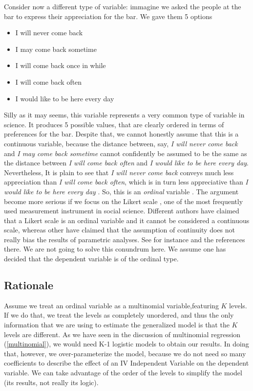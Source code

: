 \documentclass[
]{book}
\providecommand{\tightlist}{%
  \setlength{\itemsep}{0pt}\setlength{\parskip}{0pt}}
\begin{document}
Consider now a different type of variable: immagine we asked the people at the bar to express their appreciation for the bar. We gave them 5 options

\begin{itemize}
\tightlist
\item
  I will never come back
\item
  I may come back sometime
\item
  I will come back once in while
\item
  I will come back often
\item
  I would like to be here every day
\end{itemize}

Silly as it may seems, this variable represents a very common type of variable in science. It produces 5 possible values, that are clearly ordered in terms of preferences for the bar. Despite that, we cannot honestly assume that this is a continuous variable, because the distance between, say, \emph{I will never come back} and \emph{I may come back sometime} cannot confidently be assumed to be the same as the distance between \emph{I will come back often} and \emph{I would like to be here every day}. Nevertheless, It is plain to see that \emph{I will never come back} conveys much less appreciation than \emph{I will come back often}, which is in turn less appreciative than \emph{I would like to be here every day} . So, this is an \emph{ordinal} variable \citep{stevens1946theory}. The argument become more serious if we focus on the Likert scale \citep{likert1932technique}, one of the most frequently used measurement instrument in social science. Different authors have claimed that a Likert scale is an ordinal variable and it cannot be considered a continuous scale, whereas other have claimed that the assumption of continuity does not really bias the results of parametric analyses. See for instance \citet{wu2017can} and the references there. We are not going to solve this conundrum here. We assume one has decided that the dependent variable is of the ordinal type.

\hypertarget{rationale-1}{%
\subsection{Rationale}\label{rationale-1}}

Assume we treat an ordinal variable as a multinomial variable,featuring \(K\) levels. If we do that, we treat the levels as completely unordered, and thus the only information that we are using to estimate the generalized model is that the \(K\) levels are different. As we have seen in the discussion of multinomial regression (\ref{multinomial}), we would need K-1 logistic models to obtain our results. In doing that, however, we over-parameterize the model, because we do not need so many coefficients to describe the effect of an {IV {Independent Variable} } on the dependent variable. We can take advantage of the order of the levels to simplify the model (its results, not really its logic).
\end{document}
